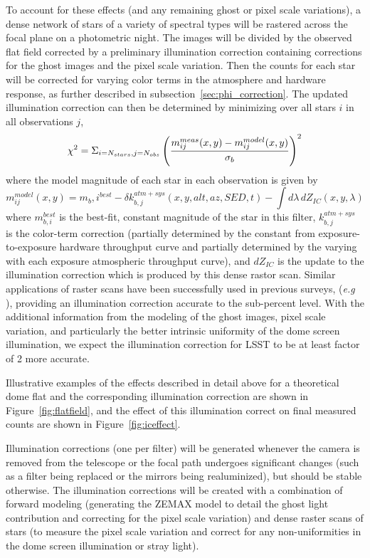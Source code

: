 \documentclass[12pt,preprint]{aastex}
\begin{document}
To account for these effects (and any remaining ghost or pixel scale
variations), a dense network of stars of a variety of spectral types
will be rastered across the focal plane on a photometric night. The
images will be divided by the observed flat field corrected by a
preliminary illumination correction containing corrections for the
ghost images and the pixel scale variation. Then the counts for
each star will be corrected for varying color terms in the atmosphere
and hardware response, as further described in
subsection~\ref{sec:phi_correction}.  The updated illumination
correction can then be determined by minimizing over all
stars $i$ in all observations $j$,
\begin{equation}
 \chi^2 =  \Sigma_{i=N_{stars},j=N_{obs}} \left( { m_{ij}^{meas}(x,y) - m_{ij}^{model}(x,y)
\over \sigma_b} \right)^2  
\end{equation}
where the model magnitude of each star in each observation is given by
\begin{equation}
m_{ij}^{model}(x,y) =  m_b,i^{best} - \delta k_{b,j}^{atm+sys}(x,y,alt,az,SED,t) - \int d\lambda \, dZ_{IC}(x,y,\lambda)
\end{equation}
where $m_{b,i}^{best}$ is the best-fit, constant magnitude of the star
in this filter, $k_{b,j}^{atm+sys}$ is the color-term correction
(partially determined by the constant from exposure-to-exposure
hardware throughput curve and partially determined by the varying with
each exposure atmospheric throughput curve), and $dZ_{IC}$ is the
update to the illumination correction which is produced by this dense
rastor scan. Similar applications of raster scans have been
successfully used in previous surveys, ({\it e.g} \citet{Regnault2009,
Magnier2004, Manfroid1996}), providing an illumination correction
accurate to the sub-percent level.  With the additional information
from the modeling of the ghost images, pixel scale variation, and
particularly the better intrinsic uniformity of the dome screen
illumination, we expect the illumination correction for LSST to be at
least factor of 2 more accurate.


Illustrative examples of the effects described in detail above for a
theoretical dome flat and the corresponding illumination correction
are shown in Figure~\ref{fig:flatfield}, and the effect of this
illumination correct on final measured counts are shown in
Figure~\ref{fig:iceffect}.

Illumination corrections (one per filter) will be generated whenever
the camera is removed from the telescope or the focal path undergoes
significant changes (such as a filter being replaced or the mirrors
being realuminized), but should be stable otherwise. The illumination
corrections will be created with a combination of forward modeling
(generating the ZEMAX model to detail the ghost light contribution and
correcting for the pixel scale variation) and dense raster scans of
stars (to measure the pixel scale variation and correct for any
non-uniformities in the dome screen illumination or stray light).
\end{document}
